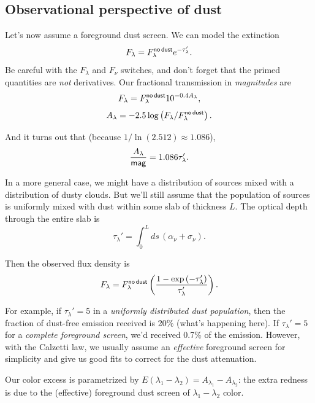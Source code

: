 \documentclass{tufte-handout}
\renewcommand{\rm}{\sf}
\begin{document}
\subsection{Observational perspective of dust}

Let's now assume a foreground dust screen. We can model the extinction
\begin{equation}
F_\lambda = F_\lambda^{\rm no\, dust} e^{-\tau_\lambda'}.
\end{equation}
Be careful with the $F_\lambda$ and $F_\nu$ switches, and don't forget that the primed quantities are \textit{not} derivatives. Our fractional transmission in \textit{magnitudes} are
\[F_\lambda = F_\lambda^{\rm no \, dust} 10^{-0.4 A_\lambda},\] 
\[A_\lambda = -2.5 \log \left (F_\lambda / F_\lambda^{\rm no\, dust}\right ).\]

And it turns out that (because $1 / \ln(2.512) \approx 1.086$),
\[\frac{A_\lambda}{\rm mag} = 1.086 \tau_\lambda'.\]

In a more general case, we might have a distribution of sources mixed with a distribution of dusty clouds. But we'll still assume that the population of sources is uniformly mixed with dust within some slab of thickness $L$. The optical depth through the entire slab is
\begin{equation}
\tau_\lambda' = \int_0^L ds \, (\alpha_\nu + \sigma_\nu).
\end{equation}

Then the observed flux density is
\begin{equation}
F_\lambda = F_\lambda^{\rm no\, dust} \left (\frac{1 - \exp\left (- \tau_\lambda'\right )}{\tau_\lambda'}\right ).
\end{equation}

For example, if $\tau_\lambda ' = 5$ in a \textit{uniformly distributed dust population}, then the fraction of dust-free emission received is 20\% (what's happening here). If $\tau_\lambda' = 5$ for a \textit{complete foreground screen}, we'd received 0.7\% of the emission. However, with the Calzetti law, we usually assume an \textit{effective} foreground screen for simplicity and give us good fits to correct for the dust attenuation.

Our color excess is parametrized by $E(\lambda_1 - \lambda_2) = A_{\lambda_1} - A_{\lambda_2}$: the extra redness is due to the (effective) foreground dust screen of $\lambda_1 - \lambda_2$ color.
\end{document}
